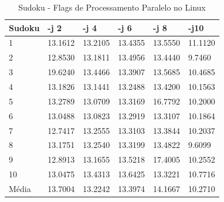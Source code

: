 \begin{table}[!ht]
\centering
\tiny
\caption{Sudoku - Flags de Processamento Paralelo no Linux}
\label{tab:flag_processamento_paralelo:linux:sudoku}
\begin{tabular}{llllll}
\textbf{Sudoku} & \textbf{-j 2} & \textbf{-j 4} & \textbf{-j 6} & \textbf{-j 8} & \textbf{-j10}  \\ \toprule
1               & 13.1612 & 13.2105 & 13.4355 & 13.5550 & 11.1120  \\ 
2               & 12.8530 & 13.1811 & 13.4956 & 13.4440 & 9.7460   \\ 
3               & 19.6240 & 13.4466 & 13.3907 & 13.5685 & 10.4685  \\ 
4               & 13.1826 & 13.1441 & 13.2488 & 13.4200 & 10.1563  \\ 
5               & 13.2789 & 13.0709 & 13.3169 & 16.7792 & 10.2000  \\ 
6               & 13.0488 & 13.0823 & 13.2919 & 13.3107 & 10.1864  \\ 
7               & 12.7417 & 13.2555 & 13.3103 & 13.3844 & 10.2037  \\ 
8               & 13.1751 & 13.2540 & 13.3199 & 13.4822 & 9.6099   \\ 
9               & 12.8913 & 13.1655 & 13.5218 & 17.4005 & 10.2552  \\ 
10              & 13.0475 & 13.4313 & 13.6425 & 13.3221 & 10.7716  \\ \bottomrule
Média           & 13.7004 & 13.2242 & 13.3974 & 14.1667 & 10.2710  \\ 
\end{tabular}
\end{table}

